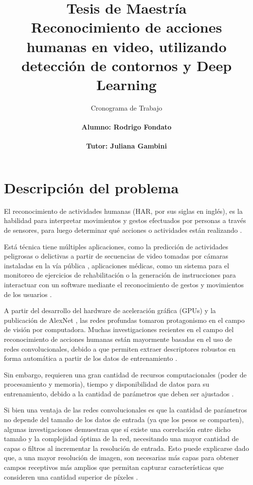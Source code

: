\documentclass[10pt]{article}
\begin{document}
\title{{\bf Tesis de Maestría}\\ Reconocimiento de acciones humanas en video, utilizando detección de contornos y Deep Learning
}
\author{Cronograma de Trabajo \\
	\ \\
	 \bf{Alumno}: Rodrigo Fondato\\
 \ \\
\bf{Tutor: Juliana Gambini}}
\date{}
\maketitle
	\Large{\textbf{}}
	
\section{Descripción del problema}

El reconocimiento de actividades humanas (HAR, por sus siglas en inglés), es la habilidad para interpretar movimientos y gestos efectuados por personas a través de sensores, para luego determinar qué acciones o actividades están realizando \citep{Ann2014}.

Está técnica tiene múltiples aplicaciones, como la predicción de actividades peligrosas o delictivas a partir de secuencias de video tomadas por cámaras instaladas en la vía pública \citep{Ryoo2011}, aplicaciones médicas, como un sistema para el monitoreo de ejercicios de rehabilitación \citep{Gonzalez-Ortega2014} o la generación de instrucciones para interactuar con un software mediante el reconocimiento de gestos y movimientos de los usuarios \citep{Gerling2012}.

A partir del desarrollo del hardware de aceleración gráfica (GPUs) y la publicación de AlexNet \citep{Krizhevsky2012}, las redes profundas tomaron protagonismo en el campo de visión por computadora. Muchas investigaciones recientes en el campo del reconocimiento de acciones humanas están mayormente basadas en el uso de redes convolucionales, debido a que permiten extraer descriptores robustos en forma automática a partir de los datos de entrenamiento \citep{Ji2013, Feichtenhofer2016, Varol2018, Ullah2017, Zhu2019}.

Sin embargo, requieren una gran cantidad de recursos computacionales (poder de procesamiento y memoria), tiempo y disponibilidad de datos para su entrenamiento, debido a la cantidad de parámetros que deben ser ajustados \citep{Li2016}.

Si bien una ventaja de las redes convolucionales es que la cantidad de parámetros no depende del tamaño de los datos de entrada (ya que los pesos se comparten), algunas investigaciones demuestran que sí existe una correlación entre dicho tamaño y la complejidad óptima de la red, necesitando una mayor cantidad de  capas o filtros al incrementar la resolución de entrada. Esto puede explicarse dado que, a una mayor resolución de imagen, son necesarias más capas para obtener campos receptivos más amplios que permitan capturar características que consideren una cantidad superior de píxeles \citep{Tan2019}.
\end{document}

